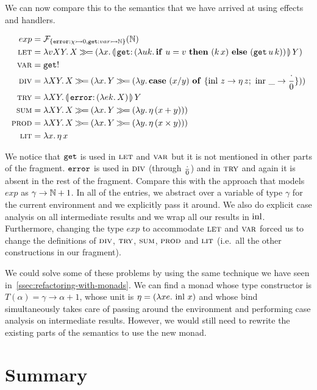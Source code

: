 We can now compare this to the semantics that we have arrived at using
effects and handlers.

\begin{align*}
  exp &= \FF_{\{\typedop{error}{\chi}{0},\typedop{get}{var}{\NN}\}}(\NN) \\
  \lete &= \lam{v X Y}{X \hsbind
    (\lam{x}{\ap{\banana{\onto{\op{get}}{(\lam{u k}{\ifte{u = v}{(\ap{k}{x})}{(\app{\op{get}}{u}{k})}})}}}{Y}})} \\
  \vare &= \op{get}! \\
  \dive &= \lam{X Y}{X \hsbind (\lam{x}{Y \hsbind (\lam{y}{\case{(x / y)}{z}{\ap{\eta}{z}}{\_}{\dbze}})})} \\
  \trye &= \lam{X Y}{\ap{\banana{\onto{\op{error}}{(\lam{e k}{X})}}}{Y}} \\
  \sume &= \lam{X Y}{X \hsbind (\lam{x}{Y \hsbind (\lam{y}{\ap{\eta}{(x + y)}})})} \\
  \prode &= \lam{X Y}{X \hsbind (\lam{x}{Y \hsbind (\lam{y}{\ap{\eta}{(x \times y)}})})} \\
  \lite &= \lam{x}{\etaE{x}}
\end{align*}

We notice that $\mathtt{get}$ is used in $\textsc{let}$ and $\textsc{var}$ but it is not
mentioned in other parts of the fragment. $\mathtt{error}$ is used in $\textsc{div}$
(through $\frac{\cdot}{0}$) and in $\textsc{try}$ and again it is absent in the rest of the
fragment. Compare this with the approach that models $exp$ as
$\gamma \to \mathbb{N} + 1$. In all of the entries, we abstract over a variable of
type $\gamma$ for the current environment and we explicitly pass it
around. We also do explicit case analysis on all intermediate results and
we wrap all our results in $\operatorname{inl}$. Furthermore, changing the type $exp$ to
accommodate $\textsc{let}$ and $\textsc{var}$ forced us to change the definitions of
$\textsc{div}$, $\textsc{try}$, $\textsc{sum}$, $\textsc{prod}$ and $\textsc{lit}$ (i.e.\ all the other
constructions in our fragment).

We could solve some of these problems by using the same technique we have
seen in~\ref{ssec:refactoring-with-monads}. We can find a monad whose type
constructor is $T(\alpha) = \gamma \to \alpha + 1$, whose unit is
$\eta = (\lambda x e.\, \operatorname{inl}\,x)$ and whose bind simultaneously takes care
of passing around the environment and performing case analysis on
intermediate results. However, we would still need to rewrite the existing
parts of the semantics to use the new monad.


\section{Summary}

